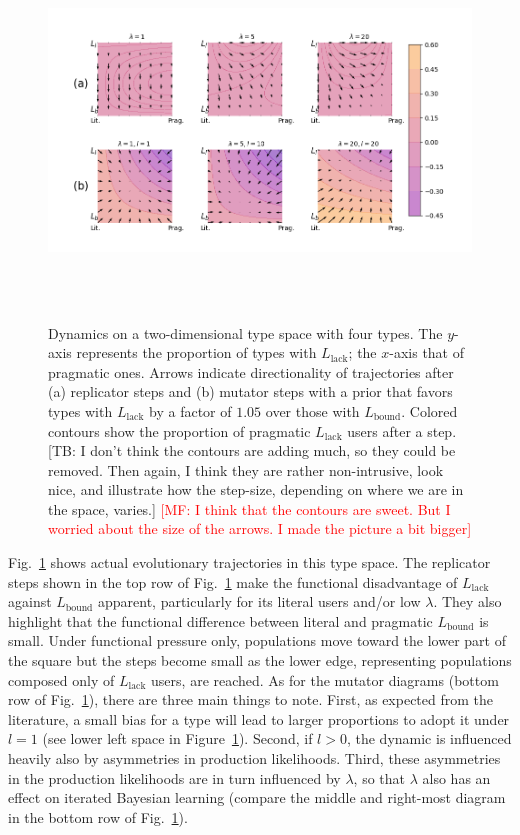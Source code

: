 \documentclass[a4paper, 11pt]{article}
\theoremstyle{Satz}
\newcommand{\mf}[1]{\textcolor{Red}{[MF: #1]}}
\newcommand{\tb}[1]{\textcolor[rgb]{.8,.33,.0}{[TB: #1]}}%
\newcommand{\mylang}[1]{\ensuremath{L_{\text{#1}}}\xspace} %
\newcommand{\Lbound}{\mylang{bound}}
\newcommand{\Llack}{\mylang{lack}}
\begin{document}
\begin{figure}[t]
\centering
\includegraphics[width=1.08\textwidth,height=10cm, keepaspectratio]{./plots/fig-contourb105k5.png}
\caption{Dynamics on a two-dimensional type space with four types. The $y$-axis represents the
  proportion of types with $\Llack$; the $x$-axis that of pragmatic ones. Arrows indicate
  directionality of trajectories after (a) replicator steps and (b) mutator steps with a prior
  that favors types with $\Llack$ by a factor of $1.05$ over those with $\Lbound$. Colored
  contours show the proportion of pragmatic $\Llack$ users after a step. \tb{I don't think the
    contours are adding much, so they could be removed. Then again, I think they are rather
    non-intrusive, look nice, and illustrate how the step-size, depending on where we are in
    the space, varies.} \mf{I think that the contours are sweet. But I worried about the size
  of the arrows. I made the picture a bit bigger}}

\label{fig:quiver}
\end{figure}

Fig.~\ref{fig:quiver} shows actual evolutionary trajectories in this type space. The replicator
steps shown in the top row of Fig.~\ref{fig:quiver} make the functional disadvantage of
$\Llack$ against $\Lbound$ apparent, particularly for its literal users and/or low
$\lambda$. They also highlight that the functional difference between literal and pragmatic
$\Lbound$ is small. Under functional pressure only, populations move toward the lower part of
the square but the steps become small as the lower edge, representing populations composed only
of $\Llack$ users, are reached. As for the mutator diagrams (bottom row of
Fig.~\ref{fig:quiver}), there are three main things to note. First, as expected from the
literature, a small bias for a type will lead to larger proportions to adopt it under $l=1$
(see lower left space in Figure~\ref{fig:quiver}). Second, if $l>0$, the dynamic is influenced
heavily also by asymmetries in production likelihoods. Third, these asymmetries in the
production likelihoods are in turn influenced by $\lambda$, so that $\lambda$ also has an
effect on iterated Bayesian learning (compare the middle and right-most diagram in the bottom
row of Fig.~\ref{fig:quiver}).
\end{document}
